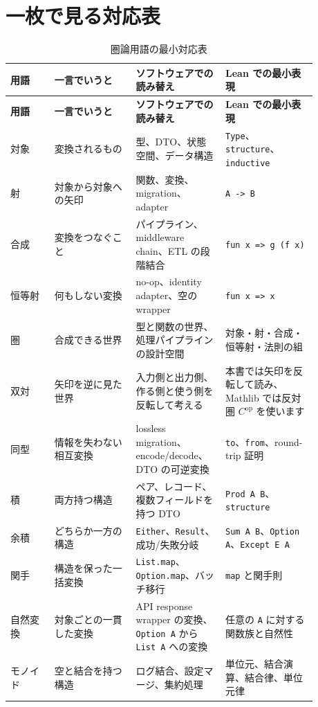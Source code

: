 \section{一枚で見る対応表}

\begingroup
\small
\setlength{\tabcolsep}{4pt}
\begin{longtable}{@{}p{0.13\linewidth}p{0.24\linewidth}p{0.24\linewidth}p{0.27\linewidth}@{}}
\caption{圏論用語の最小対応表}\label{tab:appB-category-cheatsheet}\\
\toprule
\textbf{用語} & \textbf{一言でいうと} & \textbf{ソフトウェアでの読み替え} & \textbf{Lean での最小表現} \\
\midrule
\endfirsthead
\toprule
\textbf{用語} & \textbf{一言でいうと} & \textbf{ソフトウェアでの読み替え} & \textbf{Lean での最小表現} \\
\midrule
\endhead
対象 & 変換されるもの & 型、DTO、状態空間、データ構造 & \texttt{Type}、\texttt{structure}、\texttt{inductive} \\
射 & 対象から対象への矢印 & 関数、変換、migration、adapter & \texttt{A -> B} \\
合成 & 変換をつなぐこと & パイプライン、middleware chain、ETL の段階結合 & \texttt{fun x => g (f x)} \\
恒等射 & 何もしない変換 & no-op、identity adapter、空の wrapper & \texttt{fun x => x} \\
圏 & 合成できる世界 & 型と関数の世界、処理パイプラインの設計空間 & 対象・射・合成・恒等射・法則の組 \\
双対 & 矢印を逆に見た世界 & 入力側と出力側、作る側と使う側を反転して考える & 本書では矢印を反転して読み、Mathlib では反対圏 \(C^{\mathrm{op}}\) を使います \\
同型 & 情報を失わない相互変換 & lossless migration、encode/decode、DTO の可逆変換 & \texttt{to}、\texttt{from}、round-trip 証明 \\
積 & 両方持つ構造 & ペア、レコード、複数フィールドを持つ DTO & \texttt{Prod A B}、\texttt{structure} \\
余積 & どちらか一方の構造 & \texttt{Either}、\texttt{Result}、成功/失敗分岐 & \texttt{Sum A B}、\texttt{Option A}、\texttt{Except E A} \\
関手 & 構造を保った一括変換 & \texttt{List.map}、\texttt{Option.map}、バッチ移行 & \texttt{map} と関手則 \\
自然変換 & 対象ごとの一貫した変換 & API response wrapper の変換、\texttt{Option A} から \texttt{List A} への変換 & 任意の \texttt{A} に対する関数族と自然性 \\
モノイド & 空と結合を持つ構造 & ログ結合、設定マージ、集約処理 & 単位元、結合演算、結合律、単位元律 \\

\end{longtable}
